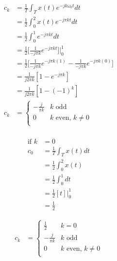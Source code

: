 \documentclass{article}
\begin{document}
\begin{equation*}
\begin{split}
    c_k &= \frac{1}{T} \int_T x(t)e^{-jk\omega_0t}dt\\  
    &= \frac{1}{2} \int_0^2 x(t)e^{-j\pi kt}dt\\  
    &= \frac{1}{2} \int_0^1 e^{-j\pi kt}dt\\ 
    &= \frac{1}{2} \Big[\frac{1}{-j \pi k}e^{-j\pi k t}\Big]\Big|_{0}^{1}\\
    &= \frac{1}{2} \Big[\frac{1}{-j \pi k}e^{-j\pi k (1)} - \frac{1}{-j \pi k}e^{-j\pi k (0)}\Big]\\
    &= \frac{1}{j2\pi k}[1 - e^{-j\pi k}]\\
    &= \frac{1}{j2\pi k} [1-(-1)^k]\\
    c_k
    &= \begin{cases}
        -\frac{j}{\pi k} & k \text{ odd}\\
        0 & k \text{ even, } k \neq 0\\
    \end{cases}\\
\end{split}
\end{equation*}

\begin{equation*}
\begin{split}
    \text{if }k &= 0\\
    c_0 &= \frac{1}{T} \int_T x(t)dt \\ 
    &= \frac{1}{2} \int_{0}^{2} x(t)\\
    &= \frac{1}{2} \int_{0}^{1} dt\\
    &= \frac{1}{2}[t]\Big|_0^1\\
    &= \frac{1}{2}
\end{split}
\end{equation*}

\begin{equation*}
\begin{split}
     c_k
    &= \begin{cases}
        \frac{1}{2} & k = 0\\
        -\frac{j}{\pi k} & k \text{ odd}\\
        0 & k \text{ even, } k \neq 0\\
    \end{cases}\\
\end{split}
\end{equation*}
\end{document}
